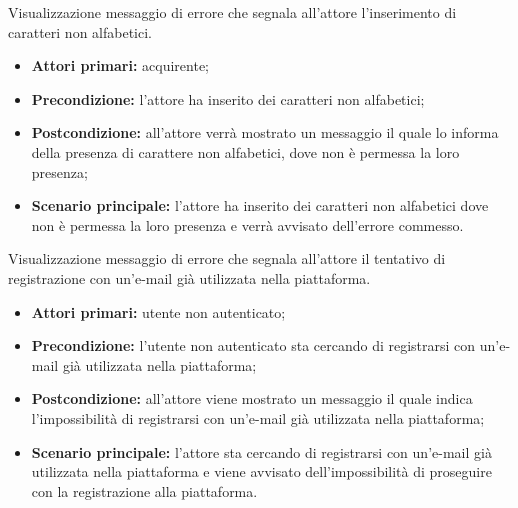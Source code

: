 \hypertarget{CAlfabetici}{}
Visualizzazione messaggio di errore che segnala all'attore l'inserimento di caratteri non alfabetici.
\begin{itemize}
    \item \textbf{Attori primari:} acquirente;
    \item \textbf{Precondizione:} l'attore ha inserito dei caratteri non alfabetici;
    \item \textbf{Postcondizione:} all'attore verrà mostrato un messaggio il quale lo informa della presenza di carattere non alfabetici, dove non è permessa la loro presenza;
    \item \textbf{Scenario principale:} l'attore ha inserito dei caratteri non alfabetici dove non è permessa la loro presenza e verrà avvisato dell'errore commesso.
\end{itemize}

\hypertarget{RegistrazioneEmailPresente}{}
Visualizzazione messaggio di errore che segnala all'attore il tentativo di registrazione con un'e-mail già utilizzata nella piattaforma.
\begin{itemize}
    \item \textbf{Attori primari:} utente non autenticato;
    \item \textbf{Precondizione:} l'utente non autenticato sta cercando di registrarsi con un'e-mail già utilizzata nella piattaforma;
    \item \textbf{Postcondizione:} all'attore viene mostrato un messaggio il quale indica l'impossibilità di registrarsi con un'e-mail già utilizzata nella piattaforma;
    \item \textbf{Scenario principale:} l'attore sta cercando di registrarsi con un'e-mail già utilizzata nella piattaforma e viene avvisato dell'impossibilità di proseguire con la registrazione alla piattaforma.
\end{itemize}

